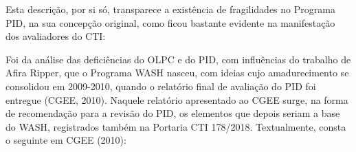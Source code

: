 \documentclass[
12pt,		%
openright,	%
twoside,  %
a4paper,			%
chapter=TITLE,		%
english,			%
french,				%
spanish,			%
brazil				%
]{USPSC-classe/USPSC}
\begin{document}
Esta descri\c{c}\~ao, por si s\'o, transparece a exist\^encia de fragilidades no Programa PID, na sua concep\c{c}\~ao original, como ficou bastante evidente na manifesta\c{c}\~ao dos avaliadores do CTI:


















\noindent\begin{center}\mbox{\centering{}}\end{center}


Foi da an\'alise das defici\^encias do OLPC e do PID, com influ\^encias do trabalho de Afira Ripper, que o Programa WASH nasceu, com ideias cujo amadurecimento se consolidou em 2009-2010, quando o relat\'orio final de avalia\c{c}\~ao do PID foi entregue  (CGEE, 2010). Naquele relat\'orio apresentado ao CGEE surge, na forma de recomenda\c{c}\~ao para a revis\~ao do PID, os elementos que depois seriam a base do WASH, registrados tamb\'em na Portaria CTI 178/2018. Textualmente, consta o seguinte em  CGEE (2010):
\end{document}
